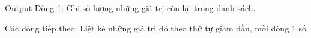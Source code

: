 Output
Dòng 1: Ghi số lượng những giá trị còn lại trong danh sách.  

   Các dòng tiếp theo: Liệt kê những giá trị đó theo thứ tự giảm dần, mỗi dòng 1 số